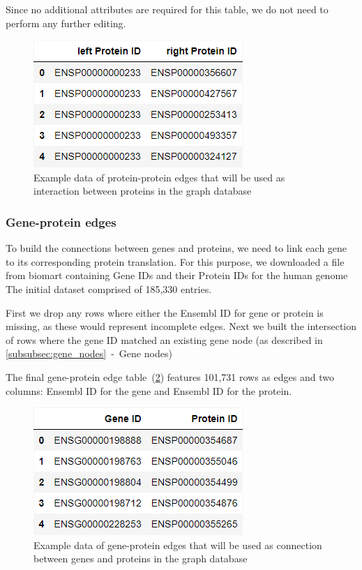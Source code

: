 Since no additional attributes are required for this table, we do not need to perform any further editing.

\begin{figure}[h]
    \centering
    \includegraphics[height=\dfheight]{figures/03_02_protein_edges}
    \caption{Example data of protein-protein edges that will be used as interaction between proteins in the graph database}
    \label{fig:03_02_df_protein_edges}
\end{figure}



\subsubsection*{Gene-protein edges} \label{subsubsec:gene_protein_connections}
To build the connections between genes and proteins, we need to link each gene to its corresponding protein translation.
For this purpose, we downloaded a file from biomart containing Gene IDs and their Protein IDs for the human genome~\cite{bio_marts}
The initial dataset comprised of 185,330 entries.

First we drop any rows where either the Ensembl ID for gene or protein is missing, as these would represent incomplete edges.
Next we built the intersection of rows where the gene ID matched an existing gene node (as described in \ref{subsubsec:gene_nodes}~-~Gene nodes)

The final gene-protein edge table~(\cref{fig:03_02_df_gene_protein_edges}) features 101,731 rows as edges and two columns:
Ensembl ID for the gene and Ensembl ID for the protein.

\begin{figure}[h]
    \centering
    \includegraphics[height=\dfheight]{figures/03_02_gene_protein_edges}
    \caption{Example data of gene-protein edges that will be used as connection between genes and proteins in the graph database}
    \label{fig:03_02_df_gene_protein_edges}
\end{figure}



